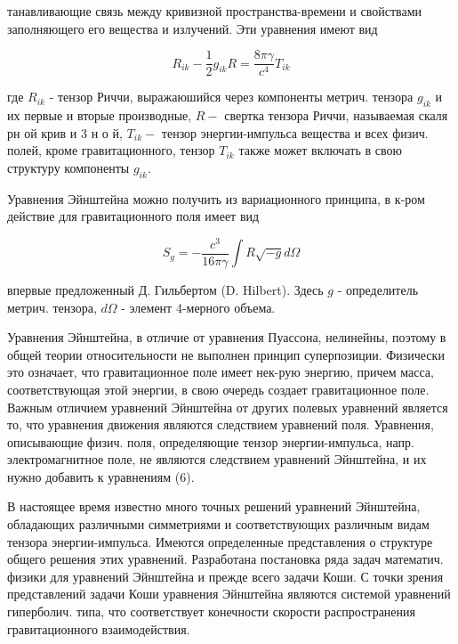 \documentclass[10pt]{article}
\begin{document}
танавливающие связь между кривизной пространства-времени и свойствами заполняющего его вещества и излучений. Эти уравнения имеют вид



\[

R_{i k}-\frac{1}{2} g_{i k} R=\frac{8 \pi \gamma}{c^{4}} T_{i k}

\]



где $R_{i k}$ - тензор Риччи, выражаюшийся через компоненты метрич. тензора $g_{i k}$ и их первые и вторые производные, $R-$ свертка тензора Риччи, называемая скаля рн ой крив и 3 н о й, $T_{i k}-$ тензор энергии-импульса вещества и всех физич. полей, кроме гравитационного, тензор $T_{i k}$ также может включать в свою структуру компоненты $g_{i k}$.



Уравнения Эйнштейна можно получить из вариационного принципа, в к-ром действие для гравитационного поля имеет вид



\[

S_{g}=-\frac{c^{3}}{16 \pi \gamma} \int R \sqrt{-g} d \Omega

\]



впервые предложенный Д. Гильбертом (D. Hilbert). Здесь $g$ - определитель метрич. тензора, $d \Omega$ - элемент 4-мерного объема.



Уравнения Эйнштейна, в отличие от уравнения Пуассона, нелинейны, поэтому в общей теории относительности не выполнен принцип суперпозиции. Физически это означает, что гравитационное поле имеет нек-рую энергию, причем масса, соответствующая этой энергии, в свою очередь создает гравитационное поле. Важным отличием уравнений Эйнштейна от других полевых уравнений является то, что уравнения движения являются следствием уравнений поля. Уравнения, описывающие физич. поля, определяющие тензор энергии-импульса, напр. электромагнитное поле, не являются следствием уравнений Эйнштейна, и их нужно добавить к уравнениям (6).



В настоящее время известно много точных решений уравнений Эйнштейна, обладающих различными симметриями и соответствующих различным видам тензора энергии-импульса. Имеются определенные представления о структуре общего решения этих уравнений. Разработана постановка ряда задач математич. физики для уравнений Эйнштейна и прежде всего задачи Коши. С точки зрения представлений задачи Коши уравнения Эйнштейна являются системой уравнений гиперболич. типа, что соответствует конечности скорости распространения гравитационного взаимодействия.
\end{document}
